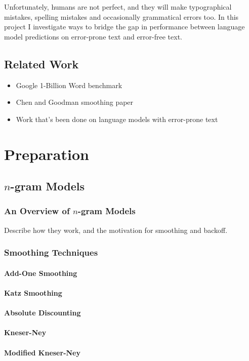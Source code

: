 \documentclass[a4paper, 12pt]{report}
\begin{document}
Unfortunately, humans are not perfect, and they will make typographical mistakes, spelling mistakes and occasionally grammatical errors too. In this project I investigate ways to bridge the gap in performance between language model predictions on error-prone text and error-free text. 

\section{Related Work}
\begin{itemize}
\item
	Google 1-Billion Word benchmark
\item
	Chen and Goodman smoothing paper
\item
	Work that's been done on language models with error-prone text 
\end{itemize}

\chapter{Preparation}
\section{$n$-gram Models}
\subsection{An Overview of $n$-gram Models}
Describe how they work, and the motivation for smoothing and backoff.
\subsection{Smoothing Techniques}
\subsubsection{Add-One Smoothing}
\subsubsection{Katz Smoothing}
\subsubsection{Absolute Discounting}
\subsubsection{Kneser-Ney}
\subsubsection{Modified Kneser-Ney}
\end{document}
